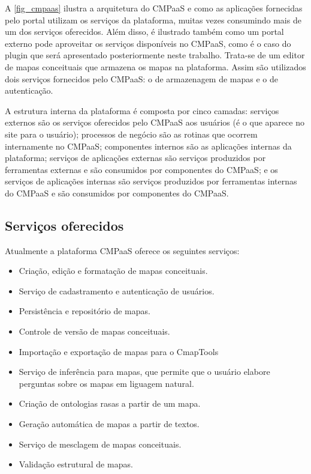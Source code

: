\documentclass[
	12pt,				%
	openright,			%
	oneside,			%
	a4paper,			%
	english,			%
	french,				%
	spanish,			%
	brazil				%
	]{abntex2}
\begin{document}
A \autoref{fig_cmpaas} ilustra a arquitetura do CMPaaS e como as aplicações fornecidas pelo portal utilizam os serviços da plataforma, muitas vezes consumindo mais de um dos serviços oferecidos. Além disso, é ilustrado também como um portal externo pode aproveitar os serviços disponíveis no CMPaaS, como é o caso do plugin que será apresentado posteriormente neste trabalho. Trata-se de um editor de mapas conceituais que armazena os mapas na plataforma. Assim são utilizados dois serviços fornecidos pelo CMPaaS: o de armazenagem de mapas e o de autenticação.

A estrutura interna da plataforma é composta por cinco camadas: serviços externos são os serviços oferecidos pelo CMPaaS aos usuários (é o que aparece no site para o usuário); processos de negócio são as rotinas que ocorrem internamente no CMPaaS; componentes internos são as aplicações internas da plataforma; serviços de aplicações externas são serviços produzidos por ferramentas externas e são consumidos por componentes do CMPaaS; e os serviços de aplicações internas são serviços produzidos por ferramentas internas do CMPaaS e são consumidos por componentes do CMPaaS.

\subsection{Serviços oferecidos}

Atualmente a plataforma CMPaaS oferece os seguintes serviços:

\begin{itemize}
	\item Criação, edição e formatação de mapas conceituais.
	\item Serviço de cadastramento e autenticação de usuários.
	\item Persistência e repositório de mapas.
	\item Controle de versão de mapas conceituais.
	\item Importação e exportação de mapas para o CmapTools
	\item Serviço de inferência para mapas, que permite que o usuário elabore perguntas sobre os mapas em liguagem natural.
	\item Criação de ontologias rasas a partir de um mapa.
	\item Geração automática de mapas a partir de textos.
	\item Serviço de mesclagem de mapas conceituais.
	\item Validação estrutural de mapas.
\end{itemize} 
\end{document}
